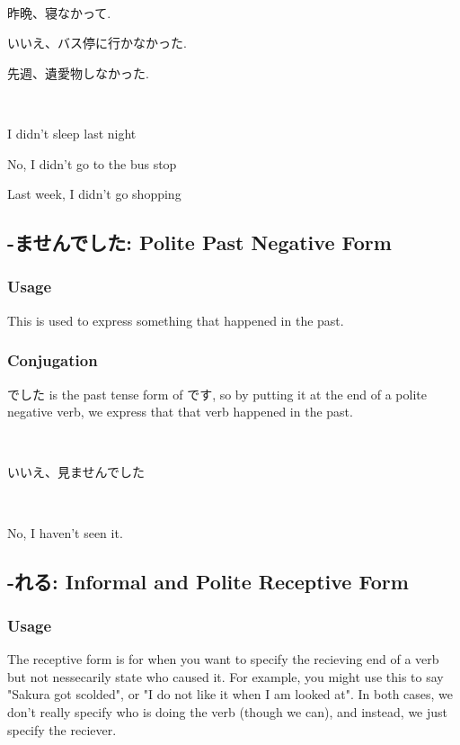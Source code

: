 \documentclass{article}
\begin{document}
\begin{CJK}{UTF8}{min}
\begin{example}
\ 

昨晩、寝なかって.

いいえ、バス停に行かなかった.

先週、遺愛物しなかった.
\end{example}

\begin{solution}
\ 

I didn't sleep last night

No, I didn't go to the bus stop

Last week, I didn't go shopping
\end{solution}

\subsection{-ませんでした: Polite Past Negative Form}

\subsubsection{Usage}
This is used to express something that happened in the past.

\subsubsection{Conjugation}

でした is the past tense form of です, so by putting it at the end of a polite negative verb, we express that that verb happened in the past.

\begin{example}
\ 

いいえ、見ませんでした
\end{example}

\begin{solution}
\ 

No, I haven't seen it.
\end{solution}

\subsection{-れる: Informal and Polite Receptive Form}

\subsubsection{Usage}

The receptive form is for when you want to specify the recieving end of a verb but not nessecarily state who caused it. For example, you might use this to say "Sakura got scolded", or "I do not like it when I am looked at". In both cases, we don't really specify who is doing the verb (though we can), and instead, we just specify the reciever.


\end{CJK}
\end{document}
